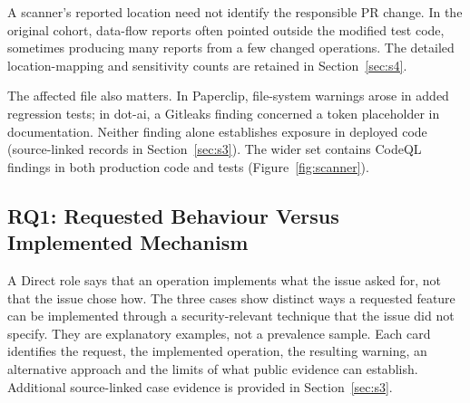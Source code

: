 \documentclass[acmsmall,screen,nonacm]{acmart}
\begin{document}
A scanner's reported location need not identify the responsible PR change. In the original cohort, data-flow reports often pointed outside the modified test code, sometimes producing many reports from a few changed operations. The detailed location-mapping and sensitivity counts are retained in Section~\ref{sec:s4}.

The affected file also matters. In Paperclip, file-system warnings arose in added regression tests; in dot-ai, a Gitleaks finding concerned a token placeholder in documentation. Neither finding alone establishes exposure in deployed code (source-linked records in Section~\ref{sec:s3}). The wider set contains CodeQL findings in both production code and tests (Figure~\ref{fig:scanner}).

\subsection{RQ1: Requested Behaviour Versus Implemented Mechanism}\label{sec:rq1-open}

A Direct role says that an operation implements what the issue asked for, not that the issue chose how. The three cases show distinct ways a requested feature can be implemented through a security-relevant technique that the issue did not specify. They are explanatory examples, not a prevalence sample. Each card identifies the request, the implemented operation, the resulting warning, an alternative approach and the limits of what public evidence can establish. Additional source-linked case evidence is provided in Section~\ref{sec:s3}.
\end{document}

